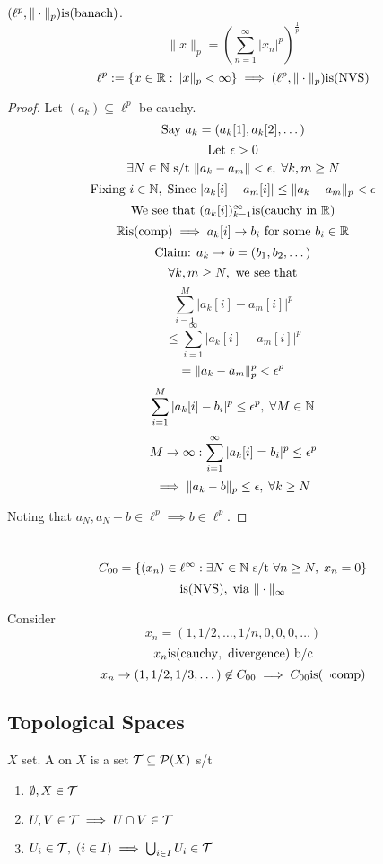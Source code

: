 \documentclass[12pt]{article}
\begin{document}
\bboxprop
\begin{prop}
    \((\ell^p,\|\cdot\|_p)\mathrm{is}(\mathrm{banach})\).
    \[
        \|x\|_p=\left(\sum_{n=1}^\infty|x_n|^p\right)^{\frac1p}
    \]
    \[
        \ell^p:=\{x\in\mathbb R:\|x\|_p<\infty\}\implies(\ell^p,\|\cdot\|_p)\mathrm{is}(\mathrm{NVS})
    \]
\end{prop}
\ebox

\bboxproof
\begin{proof}
    Let \((a_k)\subseteq\ell^p\) be cauchy.
    \[
        \text{Say }a_k=(a_k[1],a_k[2],\dots)
    \]
    \[
        \text{Let }\epsilon>0
    \]
    \[
        \exists N\in\mathbb N\text{ s/t }\|a_k-a_m\|<\epsilon,\;
        \forall k,m\ge N
    \]
    \[
        \text{Fixing }i\in\mathbb N,\;
        \text{Since }|a_k[i]-a_m[i]|\le\|a_k-a_m\|_p<\epsilon
    \]
    \[
        \text{We see that }(a_k[i])_{k=1}^\infty\mathrm{is}(\mathrm{cauchy\ in\ \mathbb R})
    \]
    \[
        \mathbb R\mathrm{is}(\mathrm{comp})\implies a_k[i]\to b_i\text{ for some }b_i\in\mathbb R
    \]
    \[
        \text{Claim: }a_k\to b=(b_1,b_2,\dots)
    \]
    \[
        \forall k,m\ge N,\text{ we see that}
    \]
    \[
        \sum_{i=1}^M|a_k[i]-a_m[i]|^p
    \]
    \[
        \le\sum_{i=1}^\infty|a_k[i]-a_m[i]|^p
    \]
    \[
        =\|a_k-a_m\|_p^p<\epsilon^p
    \]
    \[
        \sum^M_{i=1}|a_k[i]-b_i|^p\le\epsilon^p,\;\forall M\in\mathbb N
    \]
    \[
        M\to\infty:\sum_{i=1}^\infty|a_k[i]=b_i|^p\le\epsilon^p
    \]
    \[
        \implies\|a_k-b\|_p\le\epsilon,\;\forall k\ge N
    \]

    Noting that \(a_N,a_N-b\in\ell^p\implies b\in\ell^p\).
\end{proof}
\ebox

\bboxexam
\begin{exam}\
    \[
        C_{00}=\{(x_n)\in\ell^\infty:\exists N\in\mathbb N\text{ s/t }\forall n\ge N,\;x_n=0\}
    \]
    \[
        \mathrm{is}(\mathrm{NVS}),\;\text{via }\|\cdot\|_\infty
    \]

    Consider
    \[
        x_n=(1,1/2,\dots,1/n,0,0,0,\dots)
    \]
    \[
        x_n\mathrm{is}(\mathrm{cauchy,\ divergence})\text{ b/c}
    \]
    \[
        x_n\to(1,1/2,1/3,\dots)\not\in C_{00}\implies C_{00}\mathrm{is}(\mathrm{\neg comp})
    \]
\end{exam}
\ebox

\subsection{Topological Spaces}


\bboxdefn
\begin{defn}[Topology]
    \(X\) set. A  on \(X\) is a set \(\mathcal T\subseteq\mathcal P(X)\) s/t
    \begin{enumerate}
        \item \(\emptyset,X\in\mathcal T\)
        \item \(U,V\in\mathcal T\implies U\cap V\in\mathcal T\)
        \item \(U_i\in\mathcal T,\;(i\in I)\implies\bigcup_{i\in I}U_i\in\mathcal T\)
    \end{enumerate}
\end{defn}
\ebox
\end{document}
